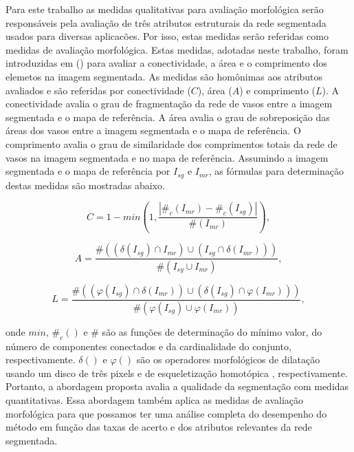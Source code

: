 Para este trabalho as medidas qualitativas para avalia\c{c}\~{a}o morfol\'{o}gica ser\~{a}o respons\'{a}veis pela avalia\c{c}\~{a}o de tr\^{e}s atributos estruturais da rede segmentada usados para diversas aplicac\~{o}es. Por isso, estas medidas ser\~{a}o referidas como medidas de avalia\c{c}\~{a}o morfol\'{o}gica. Estas medidas, adotadas neste trabalho, foram introduzidas em \citeauthor{Gegundez2013} (\citeyear{Gegundez2013}) para avaliar a conectividade, a \'{a}rea e o comprimento dos elemetos na imagem segmentada. As medidas s\~{a}o hom\^onimas aos atributos avaliados e s\~{a}o referidas por conectividade ($C$), \'{a}rea ($A$) e comprimento ($L$). A conectividade avalia o grau de fragmenta\c{c}\~{a}o da rede de vasos entre a imagem segmentada e o mapa de refer\^{e}ncia. A \'{a}rea avalia o grau de sobreposi\c{c}\~{a}o das \'{a}reas dos vasos entre a imagem segmentada e o mapa de refer\^{e}ncia. O comprimento avalia o grau de similaridade dos comprimentos totais da rede de vasos na imagem segmentada e no mapa de refer\^{e}ncia. Assumindo a imagem segmentada e o mapa de refer\^{e}ncia por $I_{sg}$ e $I_{mr}$, as f\'{o}rmulas para determina\c{c}\~{a}o destas medidas s\~{a}o mostradas abaixo. 

\begin{equation}
C = 1 - min\left( 1, \frac{|\#_c(I_{mr}) - \#_c(I_{sg})|}{\#(I_{mr})} \right),
\end{equation}

\begin{equation}
A = \frac{\#((\delta(I_{sg}) \cap I_{mr}) \cup (I_{sg} \cap \delta(I_{mr})))}{\#(I_{sg} \cup I_{mr})},
\end{equation}

\begin{equation}
L = \frac{\#((\varphi(I_{sg}) \cap \delta(I_{mr})) \cup (\delta(I_{sg}) \cap \varphi(I_{mr})))}{\#(\varphi(I_{sg}) \cup \varphi(I_{mr}))},
\end{equation}

\noindent onde $min$, $\#_c()$ e $\#$ s\~{a}o as fun\c{c}\~{o}es de determina\c{c}\~{a}o do m\'{i}nimo valor, do n\'{u}mero de componentes conectados e da cardinalidade do conjunto, respectivamente. $\delta()$ e $\varphi()$ s\~{a}o os operadores morfol\'{o}gicos de dilata\c{c}\~{a}o usando um disco de tr\^{e}s pixels e de esqueletiza\c{c}\~{a}o homot\'{o}pica \cite{Soille:2003}, respectivamente. Portanto, a abordagem proposta avalia a qualidade da segmenta\c{c}\~{a}o com medidas quantitativas. Essa abordagem tamb\'{e}m aplica as medidas de avalia\c{c}\~{a}o morfol\'{o}gica para que possamos ter uma an\'{a}lise completa do desempenho do m\'{e}todo em fun\c{c}\~{a}o das taxas de acerto e dos atributos relevantes da rede segmentada. 

